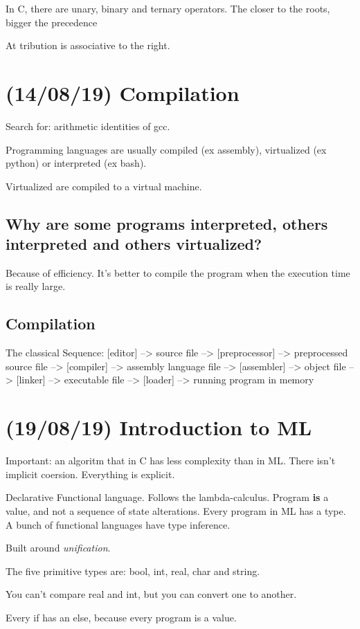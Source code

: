 \documentclass[11pt]{article}
\begin{document}
In C, there are unary, binary and ternary operators. The closer to the roots, bigger the precedence

At  tribution is associative to the right.
\section{(14/08/19) Compilation}
\label{sec:org6c8ec18}
Search for: arithmetic identities of gcc.

Programming languages are usually compiled (ex assembly), virtualized (ex python) or
interpreted (ex bash).

Virtualized are compiled to a virtual machine. 

\subsection{Why are some programs interpreted, others interpreted and others virtualized?}
\label{sec:org5ce4bd9}
Because of efficiency. It's better to compile the program when the execution time is
really large.
\subsection{Compilation}
\label{sec:org97aa50b}
The classical Sequence:
[editor] --> source file --> [preprocessor] --> preprocessed source file
--> [compiler] --> assembly language file --> [assembler] -->
object file --> [linker] --> executable file -->
[loader] --> running program in memory

\section{(19/08/19) Introduction to ML}
\label{sec:org8e05184}
Important: an algoritm that in C has less complexity than in ML.
There isn't implicit coersion. Everything is explicit.

Declarative Functional language. Follows the lambda-calculus. Program \textbf{is} a value, and
not a sequence of state alterations. Every program in ML has a type. A bunch of
functional languages have type inference.

Built around \emph{unification}.

The five primitive types are: bool, int, real, char and string.

You can't compare real and int, but you can convert one to another.

Every if has an else, because every program is a value.
\end{document}
